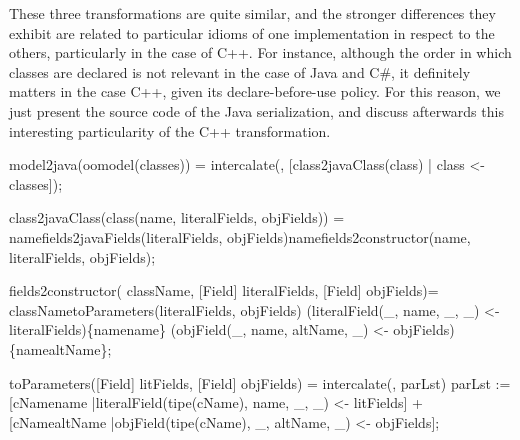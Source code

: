 \documentclass[submission,copyright,creativecommons]{eptcs}
\begin{document}
These three transformations are quite similar, and the stronger differences they exhibit are related to particular idioms of one implementation in respect to the others, particularly in the case of C++. For instance, although the order in which classes are declared is not relevant in the case of Java and C\#, it definitely matters in the case C++, given its declare-before-use policy. For this reason, we just present the source code of the Java serialization, and discuss afterwards this interesting particularity of the C++ transformation.

\begin{rascal}
 model2java(oomodel(classes)) = 
    intercalate(, {}[class2javaClass(class) | class \textless{}- classes]);

 class2javaClass(class(name, literalFields, objFields)) =
    namefields2javaFields(literalFields, objFields)namefields2constructor(name, literalFields, objFields);
    
 fields2constructor( className, [Field] literalFields, [Field] objFields)=
    classNametoParameters(literalFields, objFields) (literalField(\_{}, name, \_{}, \_{}) \textless{}- literalFields)\{{}namename\}{} (objField(\_{}, name, altName, \_{}) \textless{}- objFields)\{{}namealtName\}{};
    
 toParameters([Field] litFields, [Field] objFields) =
     intercalate(, parLst)
      parLst
             := {}[cNamename |literalField(tipe(cName), name, \_{},  \_{}) \textless{}- litFields]
               + {}[cNamealtName |objField(tipe(cName), \_{}, altName, \_{}) \textless{}- objFields];


\end{rascal}
\end{document}
